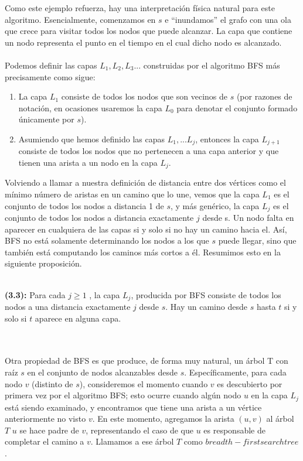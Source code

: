 \documentclass[a4paper, 12pt]{book}
\theoremstyle{dotless}
\begin{document}
Como este ejemplo refuerza, hay una interpretación física natural para este algoritmo. Esencialmente, comenzamos en $s$ e ``inundamos'' el grafo con una ola que crece para visitar todos los nodos que puede alcanzar. La capa que contiene un nodo representa el punto en el tiempo en el cual dicho nodo es alcanzado.
\\\\
Podemos definir las capas $L_1,L_2,L_3...$ construidas por el algoritmo BFS más precisamente como sigue:
	\begin{enumerate}
      \item La capa $L_1$ consiste de todos los nodos que son vecinos de $s$ (por razones de notación, en ocasiones usaremos la capa $L_0$ para denotar el conjunto formado únicamente por $s$).
      \item Asumiendo que hemos definido las capas $L_1,...L_j$, entonces la capa $L_{j+1}$ consiste de todos los nodos que no pertenecen a una capa anterior y que tienen una arista a un nodo en la capa $L_j$.
    \end{enumerate}
Volviendo a llamar a nuestra definición de distancia entre dos vértices como el mínimo número de aristas en un camino que lo une, vemos que la capa $L_1$ es el conjunto de todos los nodos a distancia 1 de $s$, y más genérico, la capa $L_j$ es el conjunto de todos los nodos a distancia exactamente $j$ desde s. Un nodo falta en aparecer en cualquiera de las capas si y solo si no hay un camino hacia el. Así, BFS no está solamente determinando los nodos a los que $s$ puede llegar, sino que también está computando los caminos más cortos a él. Resumimos esto en la siguiente proposición.
\\ \\
 \colorbox{mygray}{\parbox{15cm}{
	\textbf{(3.3):} Para cada $j \geq 1$ , la capa $L_j$, producida por BFS consiste de todos los nodos a una distancia exactamente $j$ desde $s$. Hay un camino desde $s$ hasta $t$ si y solo si $t$ aparece en alguna capa.

  }}\\
  \\
  Otra propiedad de BFS es que produce, de forma muy natural, un árbol T con raíz $s$ en el conjunto de nodos alcanzables desde $s$. Específicamente, para cada nodo $v$ (distinto de $s$), consideremos el momento cuando $v$ es descubierto por primera vez por el algoritmo BFS; esto ocurre cuando algún nodo $u$ en la capa $L_j$ está siendo examinado, y encontramos que tiene una arista a un vértice anteriormente no visto  $v$. En este momento, agregamos la arista $(u,v)$ al árbol $T$ $u$ se hace padre de $v$, representando el caso de que $u$ es responsable de completar el camino a $v$. Llamamos a ese árbol $T$ como $breadth-first search tree$.\\
  
\end{document}
